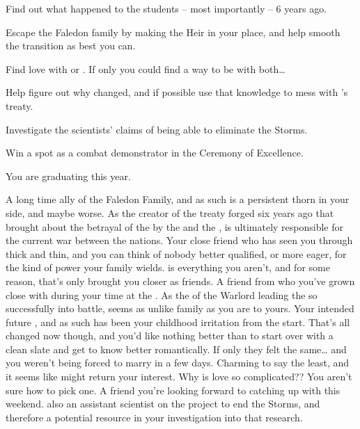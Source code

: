 \documentclass[char]{GL2020}
\begin{document}
\begin{itemz}
	\item Find out what happened to the students – most importantly \cHeirSibling{} -- 6 years ago.
	\item Escape the Faledon family by making \cAmbition{} the Heir in your place, and help smooth the transition as best you can.
	\item Find love with \cChupStudent{} or \cPresident{}. If only you could find a way to be with both\ldots{}
	\item Help \cWarlordDaughter{} figure out why \cLoud{} changed, and if possible use that knowledge to mess with \cDiplomat{}'s treaty.
	\item Investigate the scientists' claims of being able to eliminate the Storms.
	\item Win a spot as a combat demonstrator in the Ceremony of Excellence.
\end{itemz}

\begin{itemz}[Notes]
	\item You are graduating this year.
\end{itemz}

\begin{contacts}
	\contact{\cDiplomat{}} A long time ally of the Faledon Family, and as such is a persistent thorn in your side, and maybe worse. As the creator of the treaty forged six years ago that brought about the betrayal of the \pShip{} by the \pTech{} and the \pFarm{}, \cDiplomat{} is ultimately responsible for the current war between the nations.
	\contact{\cAmbition{}} Your close friend who has seen you through thick and thin, and you can think of nobody better qualified, or more eager, for the kind of power your family wields.  \cAmbition{} is everything you aren't, and for some reason, that's only brought you closer as friends.
	\contact{\cWarlordDaughter{}} A friend from \pShip{} who you've grown close with during your time at the \pSc{}. As the \cWarlordDaughter{\child} of the Warlord leading the \pShippies{} so successfully into battle, \cWarlordDaughter{} seems as unlike \cWarlordDaughter{\their} family as you are to yours.
	\contact{\cChupStudent{}} Your intended future \cChupStudent{\spouse}, and as such has been your childhood irritation from the start. That's all changed now though, and you'd like nothing better than to start over with a clean slate and get to know \cChupStudent{\them} better romantically. If only they felt the same\ldots{} and you weren't being forced to marry in a few days.
	\contact{\cPresident{}} Charming to say the least, and it seems like \cPresident{\they} might return your interest. Why is love so complicated?? You aren't sure how to pick one.
	\contact{\cAssistantScientist{}} A friend you're looking forward to catching up with this weekend. \cAssistantScientist{\theyare} also an assistant scientist on the project to end the Storms, and therefore a potential resource in your investigation into that research.
\end{contacts}
	
\end{document}

